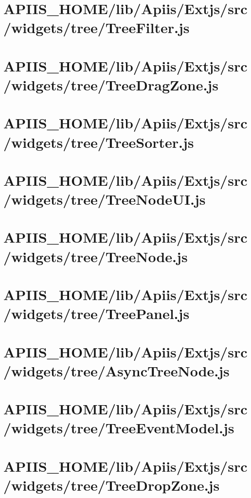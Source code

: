 \section{APIIS\_HOME/lib/Apiis/Extjs/src/widgets/tree/TreeFilter.js} 
\section{APIIS\_HOME/lib/Apiis/Extjs/src/widgets/tree/TreeDragZone.js} 
\section{APIIS\_HOME/lib/Apiis/Extjs/src/widgets/tree/TreeSorter.js} 
\section{APIIS\_HOME/lib/Apiis/Extjs/src/widgets/tree/TreeNodeUI.js} 
\section{APIIS\_HOME/lib/Apiis/Extjs/src/widgets/tree/TreeNode.js} 
\section{APIIS\_HOME/lib/Apiis/Extjs/src/widgets/tree/TreePanel.js} 
\section{APIIS\_HOME/lib/Apiis/Extjs/src/widgets/tree/AsyncTreeNode.js} 
\section{APIIS\_HOME/lib/Apiis/Extjs/src/widgets/tree/TreeEventModel.js} 
\section{APIIS\_HOME/lib/Apiis/Extjs/src/widgets/tree/TreeDropZone.js} 
